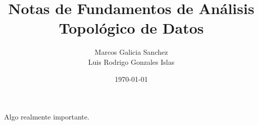 \documentclass[12pt]{book}
\author{Marcos Galicia Sanchez \\ Luis Rodrigo Gonzales Islas}
\title{Notas de Fundamentos de Análisis Topológico de Datos}
\date{\today}
\begin{document}
\frontmatter
\maketitle
Algo realmente importante.
\end{document}
